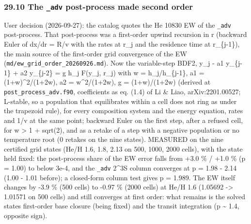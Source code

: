 \documentclass[english,a4paper]{my_memo}
\begin{document}
\subsubsection{\texorpdfstring{29.10 The \texttt{\_adv} post-process made second order}{29.10 The \_adv post-process made second order}}\label{2910-the-_adv-post-process-made-second-order}

User decision (2026-09-27): the catalog quotes the He 10830 EW of the \texttt{\_adv}
post-process. That post-process was a first-order upwind recursion in r
(backward Euler of dx/dr = R/v with the rates at r\_j and the residence time
at r\_\{j-1\}), the main source of the first-order grid convergence of the EW
(\texttt{md/ew\_grid\_order\_20260926.md}). Now the variable-step BDF2,
y\_j - a1 y\_\{j-1\} + a2 y\_\{j-2\} = g h\_j F(y\_j, r\_j) with w = h\_j/h\_\{j-1\},
a1 = (1+w)\^{}2/(1+2w), a2 = w\^{}2/(1+2w), g = (1+w)/(1+2w) (derived at
\texttt{post\_process\_adv.f90}, coefficients as eq. (1.4) of Li \& Liao,
arXiv:2201.00527; L-stable, so a population that equilibrates within a cell
does not ring as under the trapezoid rule), for every composition system
and the energy equation, rates and 1/v at the same point; backward Euler on
the first step, after a refused cell, for w \textgreater{} 1 + sqrt(2), and as a retake
of a step with a negative population or no temperature root (0 retakes on
the nine states). MEASURED on the nine certified grid states (He/H 1.6, 1.8,
2.13 on 500, 1000, 2000 cells), with the state held fixed: the post-process
share of the EW error falls from +3.0 \% / +1.0 \% (p = 1.00) to below
3e-4, and the \texttt{\_adv} 2\^{}3S column converges at p = 1.98 - 2.14 (1.00 - 1.01
before); a closed-form column test gives p = 1.989. The EW itself changes
by -3.9 \% (500 cells) to -0.97 \% (2000 cells) at He/H 1.6 (1.05692 -\textgreater{}
1.01571 on 500 cells) and still converges at first order: what remains is
the solved state\textquotesingle s first-order base closure (being fixed) and the transit
integration (p \textasciitilde{} 1.4, opposite sign).
\end{document}
